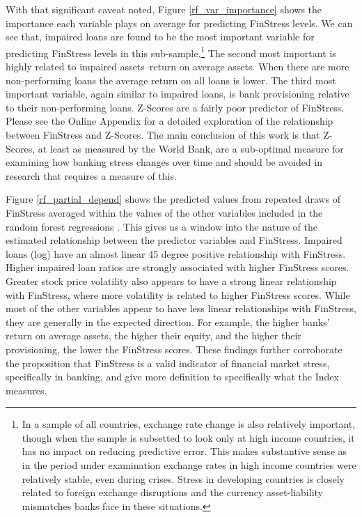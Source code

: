 \documentclass[]{article}
\begin{document}
With that significant caveat noted, Figure \ref{rf_var_importance} shows the importance each variable plays on average for predicting FinStress levels. We can see that, impaired loans are found to be the most important variable for predicting FinStress levels in this sub-sample.\footnote{In a sample of all countries, exchange rate change is also relatively important, though when the sample is subsetted to look only at high income countries, it has no impact on reducing predictive error. This makes substantive sense as in the period under examination exchange rates in high income countries were relatively stable, even during crises. Stress in developing countries is closely related to foreign exchange disruptions and the currency asset-liability mismatches banks face in these situations.} The second most important is highly related to impaired assets--return on average assets. When there are more non-performing loans the average return on all loans is lower. The third most important variable, again similar to impaired loans, is bank provisioning relative to their non-performing loans. Z-Scores are a fairly poor predictor of FinStress. Please see the Online Appendix for a detailed exploration of the relationship between FinStress and Z-Scores. The main conclusion of this work is that Z-Scores, at least as measured by the World Bank, are a sub-optimal measure for examining how banking stress changes over time and should be avoided in research that requires a measure of this.

Figure \ref{rf_partial_depend} shows the predicted values from repeated draws of FinStress averaged within the values of the other variables included in the random forest regressions \citep[see][14]{jones2015}. This gives us a window into the nature of the estimated relationship between the predictor variables and FinStress. Impaired loans (log) have an almost linear 45 degree positive relationship with FinStress. Higher impaired loan ratios are strongly associated with higher FinStress scores. Greater stock price volatility also appears to have a strong linear relationship with FinStress, where more volatility is related to higher FinStress scores. While most of the other variables appear to have less linear relationships with FinStress, they are generally in the expected direction. For example, the higher banks' return on average assets, the higher their equity, and the higher their provisioning, the lower the FinStress scores. These findings further corroborate the proposition that FinStress is a valid indicator of financial market stress, specifically in banking, and give more definition to specifically what the Index measures.
\end{document}
